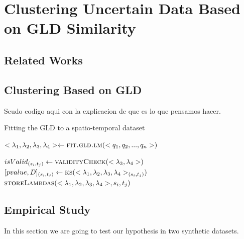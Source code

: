 \chapter[Clustering Uncertain Data Based on GLD Similarity]{Clustering Uncertain Data Based on GLD Similarity}\label{cap:gld_clustering}

\section{Related Works}

\cite{Jiang2011}

\section{Clustering Based on GLD}

Seudo codigo aqui con la explicacion de que es lo que pensamos hacer.

\begin{algorithm} 
\caption{Fitting the GLD to a spatio-temporal dataset}\label{alg:fitGLD}
\begin{algorithmic}[1] 
\State $<\lambda_{1},\lambda_{2},\lambda_{3},\lambda_{4}> \gets \Call {fit.gld.lm}{<q_1,q_2,...,q_n>}$

\State $isValid_{(s_{i},t_{j})} \gets \Call {validityCheck}{<\lambda_{3},\lambda_{4}>}$
\State $[pvalue,D]_{(s_{i},t_{j})} \gets \Call{ks}{<\lambda_{1},\lambda_{2},\lambda_{3},\lambda_{4}>_{(s_{i},t_{j})}}$
\EndIf
{}
\State $\Call{storeLambdas}{<\lambda_{1},\lambda_{2},\lambda_{3},\lambda_{4}>,s_{i},t_{j}}$
\EndIf
\EndFunction 
\end{algorithmic} 
\end{algorithm} 

\section{Empirical Study}

In this section we are going to test our hypothesis in two synthetic datasets. 

